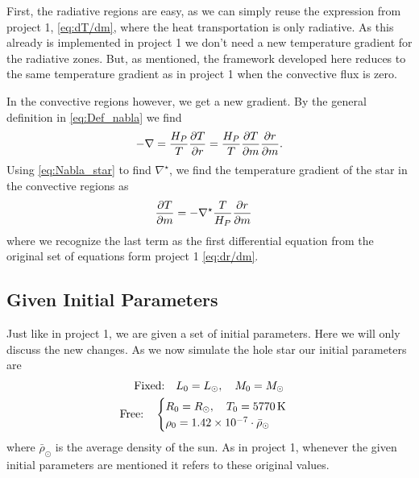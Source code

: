 \documentclass[11pt,a4paper,twocolumn,titlepage]{article}
\newcommand{\nablastar}
{
\nabla^\star
}
\begin{document}
First, the radiative regions are easy, as we can simply reuse the expression from project 1, \cref{eq:dT/dm}, where the heat transportation is only radiative. As this already is implemented in project 1 we don't need a new temperature gradient for the radiative zones. But, as mentioned, the framework developed here reduces to the same temperature gradient as in project 1 when the convective flux is zero.

In the convective regions however, we get a new gradient. By the general definition in \cref{eq:Def_nabla} we find
\begin{align*}
-\nabla = \frac{H_P}{T}\pdv{T}{r} = \frac{H_P}{T}\pdv{T}{m}\pdv{r}{m}.
\end{align*}
Using \cref{eq:Nabla_star} to find $\nablastar$, we find the temperature gradient of the star in the convective regions as
\begin{align}
\pdv{T}{m} &= -\nablastar \frac{T}{H_P}\pdv{r}{m} \label{eq:dTdm_convective}
\end{align}
where we recognize the last term as the first differential equation from the original set of equations form project 1 \cref{eq:dr/dm}.

\subsection{Given Initial Parameters}\label{subsec:Governing/Initial_parameters}
Just like in project 1, we are given a set of initial parameters. Here we will only discuss the new changes. As we now simulate the hole star our initial parameters are
\begin{gather*}
\qq*{Fixed:} L_0 = L_\odot  \qc  M_0 = M_\odot
\\
\qq*{Free:} \begin{cases}
 R_0 = R_\odot \qc  T_0 = \SI{5770}{\kelvin} \\
\rho_0 = \num{1.42e-7}\cdot\bar{\rho}_\odot  \end{cases}
\end{gather*}
where $\bar{\rho}_\odot$ is the average density of the sun. As in project 1, whenever the given initial parameters are mentioned it refers to these original values.
\end{document}
